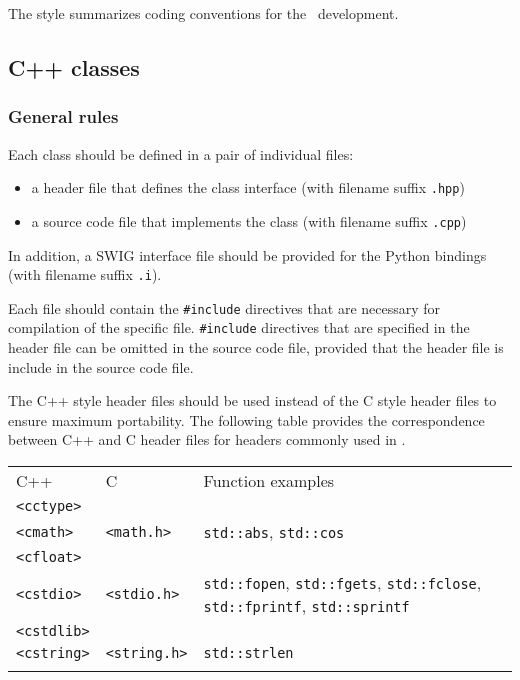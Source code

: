 \documentclass{article}[12pt,a4]
\begin{document}
The style summarizes coding conventions for the \this\ development.

\subsection{C++ classes}

\subsubsection{General rules}

Each class should be defined in a pair of individual files:
\begin{itemize}
\item a header file that defines the class interface (with filename suffix {\tt .hpp})
\item a source code file that implements the class (with filename suffix {\tt .cpp})
\end{itemize}
In addition, a SWIG interface file should be provided for the Python bindings (with filename suffix {\tt .i}).

Each file should contain the {\tt \#include} directives that are necessary for compilation of
the specific file.
{\tt \#include} directives that are specified in the header file can be omitted in the source code
file, provided that the header file is include in the source code file.

The C++ style header files should be used instead of the C style header files to ensure 
maximum portability.
The following table provides the correspondence between C++ and C header files for
headers commonly used in \this.

\begin{center}
\begin{tabular}{lll}
\hline
\hline
\noalign{\smallskip}
C++ & C & Function examples \\
\noalign{\smallskip}
\hline
\noalign{\smallskip}
{\tt <cctype>} & & \\
{\tt <cmath>} & {\tt <math.h>} & {\tt std::abs}, {\tt std::cos} \\
{\tt <cfloat>} & & \\
{\tt <cstdio>} & {\tt <stdio.h>} & {\tt std::fopen}, {\tt std::fgets}, {\tt std::fclose}, {\tt std::fprintf}, {\tt std::sprintf} \\
{\tt <cstdlib>} & & \\
{\tt <cstring>} & {\tt <string.h>} & {\tt std::strlen} \\
\noalign{\smallskip}
\hline
\end{tabular}
\end{center}
\end{document}
